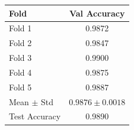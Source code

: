 \begin{tabular}{lc}
\toprule
Fold & Val Accuracy \\
\midrule
  Fold 1 & 0.9872 \\
  Fold 2 & 0.9847 \\
  Fold 3 & 0.9900 \\
  Fold 4 & 0.9875 \\
  Fold 5 & 0.9887 \\
\midrule
  Mean $\pm$ Std & $0.9876 \pm 0.0018$ \\
  Test Accuracy & 0.9890 \\
\bottomrule
\end{tabular}
